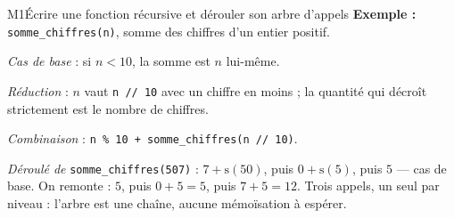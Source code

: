 \begin{fichemethode}{M1}{Écrire une fonction récursive et dérouler son arbre d'appels}
\textbf{Exemple :} \lstinline{somme_chiffres(n)}, somme des chiffres d'un entier positif.

\emph{Cas de base} : si $n < 10$, la somme est $n$ lui-même.

\emph{Réduction} : $n$ vaut \lstinline{n // 10} avec un chiffre en moins ; la quantité qui
décroît strictement est le nombre de chiffres.

\emph{Combinaison} : \lstinline{n % 10 + somme_chiffres(n // 10)}.

\emph{Déroulé de} \lstinline{somme_chiffres(507)} : $7 + \text{s}(50)$, puis
$0 + \text{s}(5)$, puis $5$ — cas de base. On remonte : $5$, puis $0+5=5$, puis $7+5=12$.
Trois appels, un seul par niveau : l'arbre est une chaîne, aucune mémoïsation à espérer.

%
%
%
%
%
%


\end{fichemethode}

